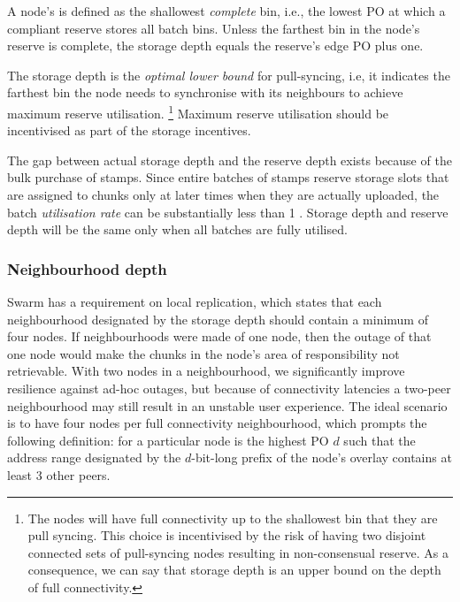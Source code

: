 A node's  is defined as the shallowest \emph{complete} bin, i.e., the lowest PO at which a compliant reserve stores all batch bins. Unless the farthest bin in the node's reserve is complete, the storage depth equals the reserve's edge PO plus one.

The storage depth is the \emph{optimal lower bound} for pull-syncing, i.e, it indicates the farthest bin the node needs to synchronise with its neighbours to achieve maximum reserve utilisation.%
%
\footnote{The nodes will have full connectivity up to the shallowest bin that they are pull syncing. This choice is incentivised by the risk of having two disjoint connected sets of pull-syncing nodes resulting in non-consensual reserve. As a consequence, we can say that storage depth is an upper bound on the depth of full connectivity.}
%
Maximum reserve utilisation should be incentivised as part of the storage incentives. 







The gap between actual storage depth and the  reserve depth exists because of the bulk purchase of stamps. Since entire batches of stamps reserve storage slots that are assigned to  chunks only at later times when they are actually uploaded, the batch \emph{utilisation rate} can be substantially less than 1%
. Storage depth and reserve depth will be the same only when all batches are fully utilised. 


\subsubsection{Neighbourhood depth}

Swarm has a requirement on local replication, which states that each neighbourhood designated by the storage depth should contain a minimum of four nodes. 
If neighbourhoods were made of one node, then the outage of that one node would make the chunks in the node's area of responsibility not retrievable.
With two nodes in a neighbourhood, we significantly improve resilience against ad-hoc outages, but because of connectivity latencies a two-peer neighbourhood may still result in an unstable user experience.
The ideal scenario is to have four nodes per full connectivity neighbourhood, which prompts the following definition:  for a particular node is the highest PO $d$ such that the address range designated by the $d$-bit-long prefix of the node's overlay contains at least 3 other peers.


